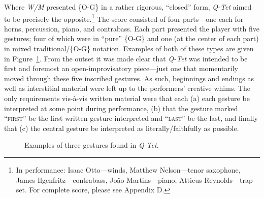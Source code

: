     Where \textit{W/M} presented \{O-G\} in a rather rigorous, ``closed'' form, \textit{Q-Tet} aimed to be precisely the opposite.\footnote{In performance: Isaac Otto---winds, Matthew Nelson---tenor saxophone, James Ilgenfritz---contrabass, João Martins---piano, Atticus Reynolds---trap set. For complete score, please see Appendix D.} The score consisted of four parts---one each for horns, percussion, piano, and contrabass. Each part presented the player with five gestures; four of which were in ``pure'' \{O-G\} and one (at the center of each part) in mixed traditional/\{O-G\} notation. Examples of both of these types are given in Figure~\ref{fig:qtet}. From the outset it was made clear that \textit{Q-Tet} was intended to be first and foremost an open-improvisatory piece---just one that momentarily moved through these five inscribed gestures. As such, beginnings and endings as well as interstitial material were left up to the performers' creative whims. The only requirements vis-à-vis written material were that each (a) each gesture be interpreted at some point during performance, (b) that the gesture marked ``\textsc{first}'' be the first written gesture interpreted and ``\textsc{last}'' be the last, and finally that (c) the central gesture be interpreted as literally/faithfully as possible. 
    
        \begin{figure}
            \centering
                {}

            \vspace{7pt}
            
                {}
    
            \vspace{7pt}
                
                {}
            \caption{Examples of three gestures found in \textit{Q-Tet}.}
            \label{fig:qtet}
        \end{figure}

